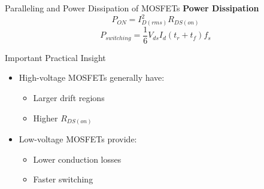 \begin{frame}{Paralleling and Power Dissipation of MOSFETs}
\textbf{Power Dissipation}
\[
P_{ON} = I_{D(rms)}^2 R_{DS(on)}
\]
\[
P_{switching} =
\frac{1}{6}V_{ds}I_d(t_r+t_f)f_s
\]
    \begin{block}{Important Practical Insight}
\begin{itemize}
    \item High-voltage MOSFETs generally have:
    \begin{itemize}
        \item Larger drift regions
        \item Higher $R_{DS(on)}$
    \end{itemize}
    \item Low-voltage MOSFETs provide:
    \begin{itemize}
        \item Lower conduction losses
        \item Faster switching
    \end{itemize}
\end{itemize}
\end{block}

\end{frame}


